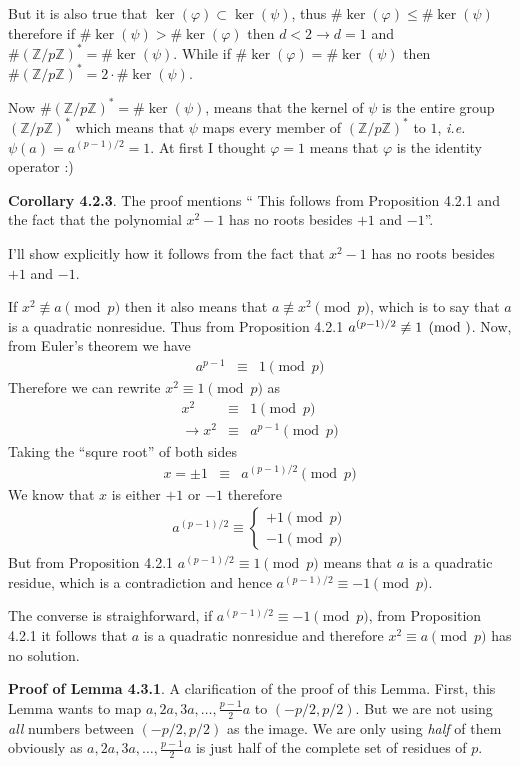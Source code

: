\documentclass[aps,preprint,preprintnumbers,nofootinbib,showpacs,prd]{revtex4-1}
\newcommand{\ie}{{\it i.e.} }
\newcommand{\ba}{\begin{array}}
\newcommand{\ea}{\end{array}}
\newcommand{\nbea}{\begin{eqnarray*}}
\newcommand{\neea}{\end{eqnarray*}}
\begin{document}
But it is also true that $\ker(\varphi) \subset \ker(\psi)$, thus $\#\ker(\varphi) \le \#\ker(\psi)$ therefore if $\#\ker(\psi) > \#\ker(\varphi)$ then $d < 2 \to d = 1$ and $\#(\mathbb{Z}/p\mathbb{Z})^* = \#\ker(\psi)$. While if $\#\ker(\varphi) = \#\ker(\psi)$ then $\#(\mathbb{Z}/p\mathbb{Z})^* = 2 \cdot \#\ker(\psi)$.

Now $\#(\mathbb{Z}/p\mathbb{Z})^* = \#\ker(\psi)$, means that the kernel of $\psi$ is the entire group $(\mathbb{Z}/p\mathbb{Z})^*$ which means that $\psi$ maps every member of $(\mathbb{Z}/p\mathbb{Z})^*$ to $1$, \ie $\psi(a) = a^{(p-1)/2} = 1$. At first I thought $\varphi = 1$ means that $\varphi$ is the identity operator :)

{\bf Corollary 4.2.3}. The proof mentions `` This follows from Proposition 4.2.1 and the fact that the polynomial $x^2 - 1$ has no roots besides $+1$ and $-1$''.

I'll show explicitly how it follows from the fact that $x^2 - 1$ has no roots besides $+1$ and $-1$.

If $x^2 \not\equiv a \pmod{p}$ then it also means that $a \not\equiv x^2 \pmod{p}$, which is to say that $a$ is a quadratic nonresidue. Thus from Proposition 4.2.1 $a^{(p-1)/2} \not\equiv 1 \pmod$. Now, from Euler's theorem we have
%
\nbea
a^{p-1} & \equiv & 1 \pmod{p}
\neea
%
Therefore we can rewrite $x^2 \equiv 1 \pmod{p}$ as
%
\nbea
x^2 & \equiv & 1 \pmod{p} \\
\to x^2 & \equiv & a^{p-1} \pmod{p}
\neea
%
Taking the ``squre root'' of both sides
%
\nbea
x = \pm 1 & \equiv & a^{(p-1)/2} \pmod{p}
\neea
%
We know that $x$ is either $+1$ or $-1$ therefore 
%
\nbea
a^{(p-1)/2} \equiv \left \{ \ba{l}
+1 \pmod{p} \\
-1 \pmod{p}
\ea \right.
\neea
%
But from Proposition 4.2.1 $a^{(p-1)/2} \equiv 1 \pmod{p}$ means that $a$ is a quadratic residue, which is a contradiction and hence $a^{(p-1)/2} \equiv -1 \pmod{p}$.

The converse is straighforward, if $a^{(p-1)/2} \equiv -1 \pmod{p}$, from Proposition 4.2.1 it follows that $a$ is a quadratic nonresidue and therefore $x^2 \equiv a \pmod{p}$ has no solution.

{\bf Proof of Lemma 4.3.1}. A clarification of the proof of this Lemma. First, this Lemma wants to map $a, 2a, 3a, \dots, \frac{p-1}{2}a$ to $(-p/2, p/2)$. But we are not using {\it all} numbers between $(-p/2, p/2)$ as the image. We are only using {\it half} of them obviously as 
$a, 2a, 3a, \dots, \frac{p-1}{2}a$ is just half of the complete set of residues of $p$.
\end{document}
